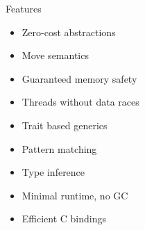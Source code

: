 
\begin{frame}{Features}
	\begin{itemize}
		\item Zero-cost abstractions
		\item Move semantics
		\item Guaranteed memory safety
		\item Threads without data races
		\item Trait based generics
		\item Pattern matching
		\item Type inference
		\item Minimal runtime, no GC
		\item Efficient C bindings
	\end{itemize}
\end{frame}
